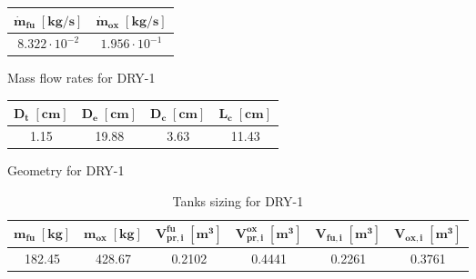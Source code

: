 \vspace*{5mm}

\begin{minipage}{0.5\linewidth}
    \centering
    \captionsetup{type=table}
    \renewcommand{\arraystretch}{1.4}
    \begin{tabular}{|c|c|}
        \hline
        $\boldsymbol{\dot{m}_{fu} \; [\textbf{kg/s}]}$  &
        $\boldsymbol{\dot{m}_{ox} \; [\textbf{kg/s}]}$  \\
        \hline
        \hline
        $8.322 \cdot 10^{-2}$ & $1.956 \cdot 10^{-1}$   \\
        \hline
    \end{tabular}
    \caption{Mass flow rates for DRY-1}
    \label{table:flow_rates_final}
\end{minipage}\hfill
\begin{minipage}{0.5\linewidth}
    \centering
    \captionsetup{type=table}
    \renewcommand{\arraystretch}{1.4}
    \begin{tabular}{|c|c|c|c|}
        \hline
        $\boldsymbol{D_t \; [\textbf{cm}]}$     &
        $\boldsymbol{D_e \; [\textbf{cm}]}$     &
        $\boldsymbol{D_c \; [\textbf{cm}]}$     &
        $\boldsymbol{L_c \; [\textbf{cm}]}$     \\
        \hline
        \hline
        1.15 & 19.88 & 3.63 & 11.43 \\
        \hline
    \end{tabular}
    \caption{Geometry for DRY-1}
    \label{table:geometry_final}
\end{minipage} 

\begin{table}[H]
    \renewcommand{\arraystretch}{1.5}
    \centering
    \begin{tabular}{|c|c|c|c|c|c|}
        \hline
        $\boldsymbol{m_{fu} \; [\textbf{kg}]}$              &
        $\boldsymbol{m_{ox} \; [\textbf{kg}]}$              &
        $\boldsymbol{V_{pr, i}^{fu} \; [\textbf{m}^3]}$     &
        $\boldsymbol{V_{pr, i}^{ox} \; [\textbf{m}^3]}$     &
        $\boldsymbol{V_{fu, i} \; [\textbf{m}^3]}$          &
        $\boldsymbol{V_{ox, i} \; [\textbf{m}^3]}$          \\
        \hline
        \hline
        182.45 & 428.67 & 0.2102 & 0.4441 & 0.2261 & 0.3761 \\
        \hline
    \end{tabular}
    \caption{Tanks sizing for DRY-1}
    \label{table:tanks_final}
\end{table}

